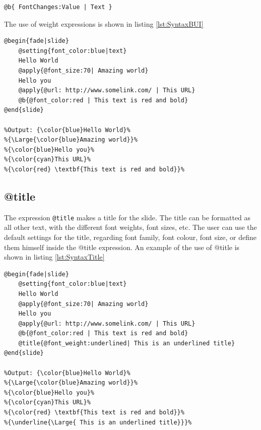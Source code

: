 {\begin{lstlisting}[frame=single, caption=font weight expression generic]
@b{ FontChanges:Value | Text }
\end{lstlisting}

The use of weight expressions is shown in listing \ref{lst:SyntaxBUI}
\begin{lstlisting}[frame=single, caption=Hello World with font weight, label=lst:SyntaxBUI]
@begin{fade|slide}
    @setting{font_color:blue|text}
    Hello World
    @apply{@font_size:70| Amazing world}
    Hello you
    @apply{@url: http://www.somelink.com/ | This URL}
    @b{@font_color:red | This text is red and bold}
@end{slide}

%Output: {\color{blue}Hello World}%
%{\Large{\color{blue}Amazing world}}%
%{\color{blue}Hello you}%
%{\color{cyan}This URL}%
%{\color{red} \textbf{This text is red and bold}}%
\end{lstlisting}

\subsection{@title}
The expression \texttt{@title} makes a title for the slide. The title can be formatted as all other text, with the different font weights, font sizes, etc. The user can use the default settings for the title, regarding font family, font colour, font size, or define them himself inside the @title expression.
An example of the use of @title is shown in listing \ref{lst:SyntaxTitle}

\begin{lstlisting}[frame=single, caption=Hello World with title, label=lst:SyntaxTitle]
@begin{fade|slide}
    @setting{font_color:blue|text}
    Hello World
    @apply{@font_size:70| Amazing world}
    Hello you
    @apply{@url: http://www.somelink.com/ | This URL}
    @b{@font_color:red | This text is red and bold}
    @title{@font_weight:underlined| This is an underlined title}
@end{slide}

%Output: {\color{blue}Hello World}%
%{\Large{\color{blue}Amazing world}}%
%{\color{blue}Hello you}%
%{\color{cyan}This URL}%
%{\color{red} \textbf{This text is red and bold}}%
%{\underline{\Large{ This is an underlined title}}}%
\end{lstlisting}


}
